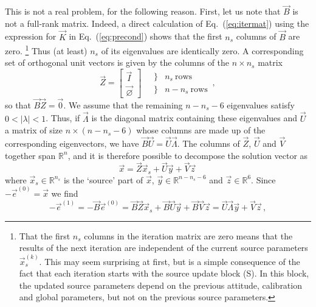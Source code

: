 \documentclass[structabstract]{aa}
\begin{document}
This is not a real problem, for the following reason. First, let us note
that $\vec{B}$ is not a full-rank matrix. Indeed, a direct calculation of
Eq.~(\ref{eq:itermat}) using the expression for $\vec{K}$ in
Eq.~(\ref{eq:precond}) shows that the first $n_s$ columns of $\vec{B}$
are zero.%
\footnote{That the first $n_s$ columns in the iteration matrix are zero
means that the results of the next iteration are independent of the current
source parameters $\vec{x}_s^{(k)}$. This may seem surprising at first, but is
a simple consequence of the fact that each iteration starts with the source
update block (S). In this block, the updated source parameters depend on the
previous attitude, calibration and global parameters, but not on the
previous source parameters.\label{footnote10}}
Thus (at least) $n_s$ of its eigenvalues are identically zero.
A corresponding set of orthogonal unit vectors is given by the columns
of the $n\times n_s$ matrix
\begin{equation}\label{eq:eigenZ}
\vec{Z}= \left[\begin{array}{c} \vec{I} \\[3pt] \vec{\varnothing} \end{array}\right]
\quad\begin{array}{cl} \} & n_s~\text{rows}\\[3pt] \} & n-n_s~\text{rows} \end{array} \, ,
\end{equation}
so that $\vec{B}\vec{Z}=\vec{0}$. We assume that the remaining $n-n_s-6$
eigenvalues satisfy $0<|\lambda|<1$. Thus, if $\vec{\Lambda}$ is the diagonal
matrix containing these eigenvalues and $\vec{U}$ a matrix of size
$n\times(n-n_s-6)$ whose columns are made up of the corresponding eigenvectors,
we have $\vec{B}\vec{U}=\vec{U}\vec{\Lambda}$. The columns of $\vec{Z}$,
$\vec{U}$ and $\vec{V}$ together span $\mathbb{R}^n$, and it is therefore
possible to decompose the solution vector as
\begin{equation}\label{eq:xdecomp}
\vec{x} = \vec{Z}\vec{x}_s+\vec{U}\vec{y}+\vec{V}\vec{z} \,
\end{equation}
where $\vec{x}_s\in\mathbb{R}^{n_s}$ is the `source' part of $\vec{x}$,
$\vec{y}\in\mathbb{R}^{n-n_s-6}$ and $\vec{z}\in\mathbb{R}^{6}$.
Since $-\vec{e}^{(0)}=\vec{x}$ we find
\begin{equation}\label{eq:xdecomp1}
-\vec{e}^{(1)}
= -\vec{B}\vec{e}^{(0)}
= \vec{B}\vec{Z}\vec{x}_s+\vec{B}\vec{U}\vec{y}+\vec{B}\vec{V}\vec{z}
= \vec{U}\vec{\Lambda}\vec{y}+\vec{V}\vec{z} \, ,
\end{equation}
\end{document}

